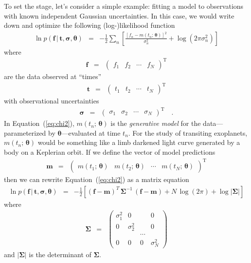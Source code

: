 \documentclass[12pt,preprint]{aastex}
\newcommand{\Eq}[1]{Equation~(\ref{eq:#1})}
\newcommand{\eq}[1]{\Eq{#1}}
\newcommand{\eqlabel}[1]{\label{eq:#1}}
\newcommand{\bvec}[1]{\ensuremath{\boldsymbol{#1}}}
\begin{document}
To set the stage, let's consider a simple example: fitting a model to
observations with known independent Gaussian uncertainties.
In this case, we would write down and optimize the following (log-)likelihood
function
\begin{eqnarray}\eqlabel{chi2}
\ln p(\bvec{f}\,|\,\bvec{t},\bvec{\sigma},\bvec{\theta}) &=&
-\frac{1}{2} \sum_n \left [ \frac{[f_n - m(t_n;\,\bvec{\theta})]^2}{\sigma_n^2}
+ \log (2\pi\sigma_n^2) \right ]
\end{eqnarray}
where
\begin{eqnarray}
\bvec{f} &=& \left ( \begin{array}{cccc}
f_1 & f_2 & \cdots & f_N
\end{array} \right )^\mathrm{T}
\end{eqnarray}
are the data observed at ``times''
\begin{eqnarray}
\bvec{t} &=& \left ( \begin{array}{cccc}
t_1 & t_2 & \cdots & t_N
\end{array} \right )^\mathrm{T}
\end{eqnarray}
with observational uncertainties
\begin{eqnarray}
\bvec{\sigma} &=& \left ( \begin{array}{cccc}
\sigma_1 & \sigma_2 & \cdots & \sigma_N
\end{array} \right )^\mathrm{T} \quad.
\end{eqnarray}
In \eq{chi2}, $m(t_n;\,\bvec{\theta})$ is the \emph{generative model} for the
data---parameterized by $\bvec{\theta}$---evaluated at time $t_n$.
For the study of transiting exoplanets, $m(t_n;\,\bvec{\theta})$ would be
something like a limb darkened light curve generated by a body on a Keplerian
orbit.
If we define the vector of model predictions
\begin{eqnarray}
\bvec{m} &=& \left ( \begin{array}{cccc}
m(t_1;\,\bvec{\theta}) & m(t_2;\,\bvec{\theta}) & \cdots & m(t_N;\,\bvec{\theta})
\end{array} \right )^\mathrm{T}
\end{eqnarray}
then we can rewrite \eq{chi2} as a matrix equation
\begin{eqnarray}\eqlabel{lnlike}
\ln p(\bvec{f}\,|\,\bvec{t},\bvec{\sigma},\bvec{\theta}) &=&
-\frac{1}{2}\left [
    (\bvec{f}-\bvec{m})^T\,\bvec{\Sigma}^{-1}\,(\bvec{f}-\bvec{m})
        + N\,\log (2\pi) + \log |\bvec{\Sigma}|
\right ]
\end{eqnarray}
where
\begin{eqnarray}
\bvec{\Sigma} &=& \left (\begin{array}{cccc}
\sigma_1^2 & 0 & & 0 \\
0 & \sigma_2^2 & & 0 \\
& & \cdots & \\
0 & 0 & 0 & \sigma_N^2
\end{array}\right )
\end{eqnarray}
and $|\bvec{\Sigma}|$ is the determinant of $\bvec{\Sigma}$.
\end{document}
